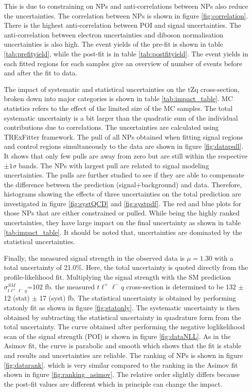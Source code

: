 This is  due to constraining on NPs and anti-correlations between NPs also reduce the uncertainties. The correlation between NPs is shown in figure \ref{fig:correlation}. There is the highest anti-correlation between POI and signal uncertainties. The anti-correlation between electron uncertainties and diboson normalisation uncertainties is also high. The event yields of the pre-fit is shown in table \ref{tab:prefityield}, while the post-fit is in table \ref{tab:postfityield}. The event yields in each fitted regions for each samples give an overview of number of events before and after the fit to data.   


The impact of systematic and statistical uncertainties on the tZq cross-section, broken down into major categories is shown in table \ref{tab:impact_table}.  MC statistics refers to the effect of the limited size of the MC samples. The total systematic uncertainty is a bit larger than the quadratic sum of the individual contributions due to correlations. The uncertainties are calculated using TRExFitter framework. The pull of all NPs obtained when fitting signal regions and control regions simultaneously to the data are shown in figure \ref{fig:datapull}. It shows that only few pulls are away from zero but are still within the respective $\pm 1\sigma$ bands. The NPs with largest pull are related to signal modeling uncertainties.  The pulls are further studied to see if they are able to compensate the difference between the prediction (signal+background) and data. Therefore, histograms showing the effects of three uncertainties on the total prediction are investigated in figure \ref{fig:systQCD} and \ref{fig:systpdf}. The red and blue plots for those NPs that are either constrained or pulled. While being the highly ranked uncertainties, they have large impact on the final uncertainty as shown in table \ref{tab:impact_table}. It should be noted that, uncertainties are  dominated by the statistical uncertainties.



Finally, the measured signal strength in the observed data is $\mu = 1.30$ with a total uncertainty of 21.0\%. Here, the total uncertainty is quoted directly from the profile-likelihood fit. Multiplying the signal strength with the SM prediction $\sigma^{SM}_{t \ell^{+}\ell^{-} q}$=102 fb. the measured $t \ell^{+}\ell^{-} q$ cross-section is determined to be  132 $\pm$ 12 (stat) $\pm$ 17 (syst) fb. The statistical uncertainty is obtained by performing statonly fit as shown in figure \ref{fig:statonly}. The systematic uncertainty is then obtained by subtracting the statistical uncertainty in quadrature form from the total uncertainty. The curve obtained after performing the negative loglikelihood scan of the signal strength (POI) is shown in figure \ref{fig:dataNLL}. As in the Asimov fit, the curve is parabolic and smooth which shows that the fit is stable and results and uncertainties are reliable. The ranking of NPs is shown in figure \ref{fig:datarank}. which is very similar compared to the ranking in the Asimov fit shown in figure \ref{fig:ranking_asimov}. The relative order slightly differs because the post-fit values are different which in principle can change the impact.

